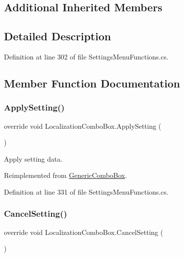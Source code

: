 \subsection*{Additional Inherited Members}


\subsection{Detailed Description}


Definition at line 302 of file Settings\+Menu\+Functions.\+cs.



\subsection{Member Function Documentation}
\mbox{\label{class_localization_combo_box_ad531f8563cc8085e0129d4d719f8f82b}} 
\subsubsection{\texorpdfstring{Apply\+Setting()}{ApplySetting()}}
{\footnotesize\ttfamily override void Localization\+Combo\+Box.\+Apply\+Setting (\begin{DoxyParamCaption}{ }\end{DoxyParamCaption})\hspace{0.3cm}{\ttfamily [virtual]}}



Apply setting data. 



Reimplemented from \hyperlink{class_generic_combo_box_a5aced71f035bd463a4ebaaffe19ec547}{Generic\+Combo\+Box}.



Definition at line 331 of file Settings\+Menu\+Functions.\+cs.

\mbox{\label{class_localization_combo_box_a67bf48bcaf083f7cdfb59fe2e82d0f12}} 
\subsubsection{\texorpdfstring{Cancel\+Setting()}{CancelSetting()}}
{\footnotesize\ttfamily override void Localization\+Combo\+Box.\+Cancel\+Setting (\begin{DoxyParamCaption}{ }\end{DoxyParamCaption})\hspace{0.3cm}{\ttfamily [virtual]}}



